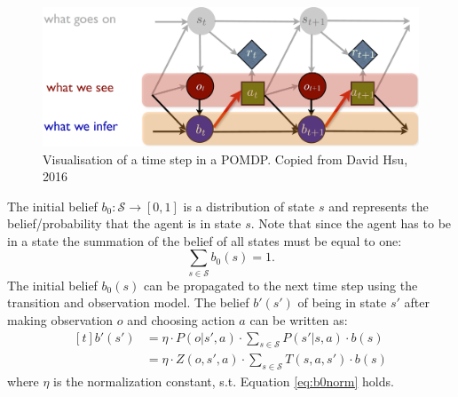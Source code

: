 \begin{figure}
    \centering
    \includegraphics[width=\textwidth]{Report/images/POMDP.png}
    \caption{Visualisation of a time step in a POMDP. Copied from David Hsu, 2016 \cite{POMDPpresi}}
    \label{fig:POMDP}
\end{figure}


The initial belief $b_0:\mathcal{S}\rightarrow [0, 1]$ is a distribution of state $s$ and represents the belief/probability that the agent is in state $s$. Note that since the agent has to be in a state the summation of the belief of all states must be equal to one:
\begin{equation}\label{eq:b0norm}
    \sum_{s\in\mathcal{S}} b_0(s)=1.
\end{equation}
The initial belief $b_0(s)$ can be propagated to the next time step using the transition and observation model. The belief $b'(s')$ of being in state $s'$ after making observation $o$ and choosing action $a$ can be written as:
%
\begin{equation}\label{eq:bdash}
    \begin{aligned}[t]
    b'(s') &= \eta \cdot P(o|s', a)\cdot \sum_{s\in\mathcal{S}}P(s'|s,a)\cdot b(s) \\
    &=\eta \cdot Z(o,s',a)\cdot \sum_{s\in\mathcal{S}}T(s,a,s')\cdot b(s)
    \end{aligned}
\end{equation}
%
where $\eta$ is the normalization constant, s.t. Equation \ref{eq:b0norm} holds.\\

